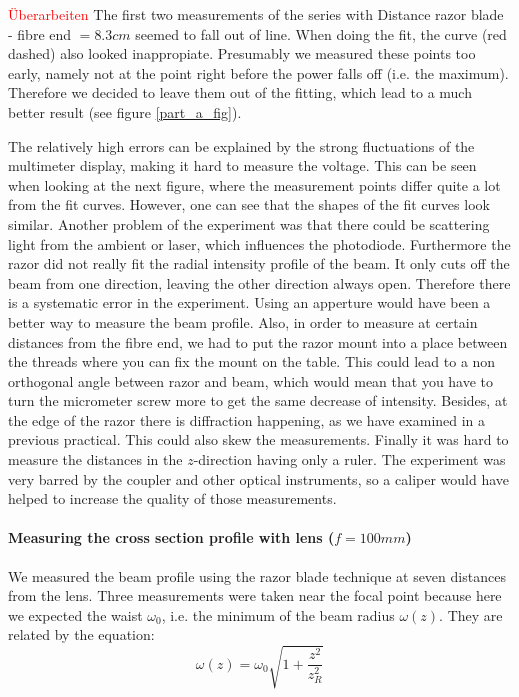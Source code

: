 \documentclass{article}
\begin{document}
\textcolor{red}{Überarbeiten}
The first two measurements of the series with Distance razor blade - fibre end $= 8.3 cm$ seemed to fall out of line. When doing the fit, the curve (red dashed) also looked inappropiate. Presumably we measured these points too early, namely not at the point right before the power falls off (i.e. the maximum). Therefore we decided to leave them out of the fitting, which lead to a much better result (see figure \ref{part_a_fig}).

The relatively high errors can be explained by the strong fluctuations of the multimeter display, making it hard to measure the voltage. This can be seen when looking at the next figure, where the measurement points differ quite a lot from the fit curves. However, one can see that the shapes of the fit curves look similar. Another problem of the experiment was that there could be scattering light from the ambient or laser, which influences the photodiode. Furthermore the razor did not really fit the radial intensity profile of the beam. It only cuts off the beam from one direction, leaving the other direction always open. Therefore there is a systematic error in the experiment. Using an apperture would have been a better way to measure the beam profile. Also, in order to measure at certain distances from the fibre end, we had to put the razor mount into a place between the threads where you can fix the mount on the table. This could lead to a non orthogonal angle between razor and beam, which would mean that you have to turn the micrometer screw more to get the same decrease of intensity. Besides, at the edge of the razor there is diffraction happening, as we have examined in a previous practical. This could also skew the measurements. Finally it was hard to measure the distances in the $z$-direction having only a ruler. The experiment was very barred by the coupler and other optical instruments, so a caliper would have helped to increase the quality of those measurements.

\paragraph{Measuring the cross section profile with lens ($f=100mm$)}

We measured the beam profile using the razor blade technique at seven distances from the lens. Three measurements were taken near the focal point because here we expected the waist $\omega_{0}$, i.e. the minimum of the beam radius $\omega (z)$. They are related by the equation:
\begin{equation}
\omega (z) = \omega_{0}\sqrt{1+\frac{z^2}{z_{R}^2}}
\label{omegaofz}
\end{equation}
\end{document}
